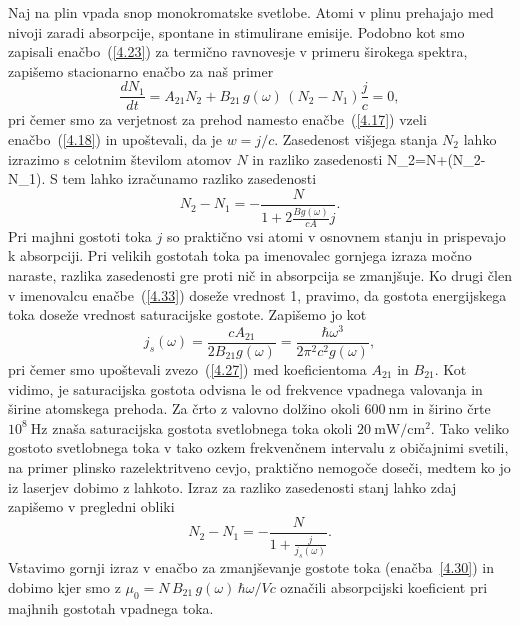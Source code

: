 Naj na plin vpada snop monokromatske svetlobe. 
Atomi v plinu prehajajo med nivoji zaradi absorpcije, spontane in stimulirane emisije. 
Podobno kot smo zapisali enačbo~(\ref{4.23}) za termično ravnovesje v primeru
širokega spektra, zapišemo stacionarno enačbo za naš primer
\begin{equation}
\frac{dN_{1}}{dt}=A_{21}N_{2}+B_{21}\,g(\omega)\,(N_{2}-N_{1})\frac{j}{c}=0,
\label{4.32}
\end{equation}
pri čemer smo za verjetnost za prehod namesto enačbe~(\ref{4.17}) vzeli
enačbo~(\ref{4.18}) in upoštevali, da je $w=j/c$. Zasedenost višjega stanja $N_{2}$ lahko izrazimo s 
celotnim številom atomov $N$ in razliko zasedenosti 
\beq
N_{2}=N+(N_{2}-N_{1}).
\label{4.321}
\eeq
S tem lahko izračunamo razliko zasedenosti 
\begin{equation}
N_{2}-N_{1}=-\frac{N}{1+2\frac{Bg(\omega)}{cA}j}.
\label{4.33}
\end{equation}
Pri majhni gostoti toka $j$ so praktično vsi atomi v osnovnem stanju in prispevajo
k absorpciji. Pri velikih gostotah toka pa imenovalec gornjega
izraza močno naraste, razlika zasedenosti gre proti nič in absorpcija se zmanjšuje.
Ko drugi člen v imenovalcu enačbe~(\ref{4.33}) doseže vrednost 1, pravimo, da
gostota energijskega toka doseže vrednost saturacijske gostote.
Zapišemo jo kot 
\begin{equation}
j_{s}(\omega)=\frac{cA_{21}}{2B_{21}g(\omega)}=
\frac{\hbar\omega^{3}}{2\pi^{2}c^{2}g(\omega)},
\label{4.34}
\end{equation}
pri čemer smo upoštevali zvezo~(\ref{4.27}) med koeficientoma $A_{21}$ in $B_{21}$.
Kot vidimo, je saturacijska gostota odvisna le od frekvence vpadnega valovanja 
in širine atomskega prehoda. Za črto z valovno dolžino okoli $600~\si{\nano\metre}$ 
in širino črte $10^{8}~\si{\hertz}$ znaša saturacijska gostota svetlobnega toka okoli 
$20~\si{\milli\watt/\centi\metre^2}$. Tako veliko gostoto svetlobnega toka v tako ozkem
frekvenčnem intervalu z običajnimi svetili, na primer plinsko razelektritveno cevjo,
praktično nemogoče doseči, medtem ko jo iz laserjev dobimo z lahkoto.
Izraz za razliko zasedenosti stanj lahko zdaj zapišemo v pregledni obliki
\begin{equation}
N_{2}-N_{1}=-\frac{N}{1+\frac{j}{j_{s}(\omega)}}.
\label{4.35}
\end{equation}
Vstavimo gornji izraz v enačbo za zmanjševanje gostote toka (enačba~\ref{4.30}) in 
dobimo 
kjer smo z $\mu_{0}=N\,B_{21}\,g(\omega)\,\hbar\omega/Vc$ označili
absorpcijski koeficient pri majhnih gostotah vpadnega toka.

